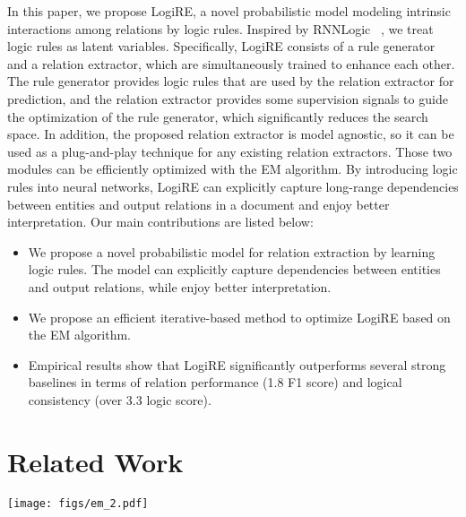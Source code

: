 \documentclass[11pt]{article}
\newcommand{\mymodel}{LogiRE\xspace}
\begin{document}
In this paper, we propose \mymodel, a novel probabilistic model modeling intrinsic interactions among relations by logic rules.
Inspired by RNNLogic ~\cite{qu2020rnnlogic},
we treat logic rules as latent variables.
Specifically,
\mymodel consists of a rule generator and a relation extractor,
which are simultaneously trained to enhance each other.
The rule generator provides logic rules that are used by the relation extractor for prediction, 
and the relation extractor provides some supervision signals to guide the optimization of the rule generator, which significantly reduces the search space.
In addition, the proposed relation extractor is model agnostic, so it can be used as a plug-and-play technique for any existing relation extractors.
Those two modules can be efficiently optimized with the EM algorithm.
By introducing logic rules into neural networks, 
\mymodel can explicitly capture long-range dependencies between entities and output relations in a document and enjoy better interpretation.
Our main contributions are listed below:
\begin{itemize}[leftmargin=1pt, itemindent=1pc]
    \item We propose a novel probabilistic model for relation extraction by learning logic rules.
    The model can explicitly capture dependencies between entities and output relations, while enjoy better interpretation.
    \item We propose an efficient iterative-based method to optimize \mymodel based on the EM algorithm.
    \item Empirical results show that \mymodel significantly outperforms several strong baselines in terms of relation performance (1.8 F1 score) and logical consistency (over 3.3 logic score).
\end{itemize}














 
\section{Related Work}
\label{sec:related}
\begin{figure*}
    \centering
    \texttt{[image: figs/em\_2.pdf]}
    \caption{The overview of \mymodel. \mymodel consists of two modules: a rule generator  and a relation extractor . For a given document  and a query triple , we treat the required logic rules as latent variables , aiming to identify the corresponding truth value . During \textcolor{myblue}{inference}, we sample from the rule generator for the latent rule set and use the relation extractor to predict  given the rules. The overall objective (maximizing the likelihood) is optimized by the EM algorithm. In the \textcolor{myred}{E-step}, we estimate the approximate posterior ; In the \textcolor{mygreen}{M-step}, we maximize a lower bound of the likelihood w.r.t. .}
    \label{fig:overview}
\end{figure*}
\end{document}
